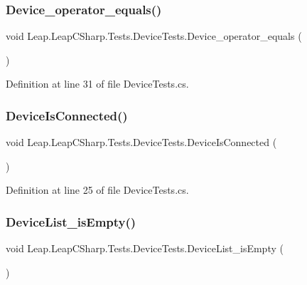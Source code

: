 \subsubsection{\texorpdfstring{Device\_operator\_equals()}{Device\_operator\_equals()}}
{\footnotesize\ttfamily void Leap.\+Leap\+C\+Sharp.\+Tests.\+Device\+Tests.\+Device\+\_\+operator\+\_\+equals (\begin{DoxyParamCaption}{ }\end{DoxyParamCaption})}



Definition at line 31 of file Device\+Tests.\+cs.

\mbox{\label{class_leap_1_1_leap_c_sharp_1_1_tests_1_1_device_tests_aa1d40f9bbc350ccc7e003e49883a0d1f}} 
\subsubsection{\texorpdfstring{DeviceIsConnected()}{DeviceIsConnected()}}
{\footnotesize\ttfamily void Leap.\+Leap\+C\+Sharp.\+Tests.\+Device\+Tests.\+Device\+Is\+Connected (\begin{DoxyParamCaption}{ }\end{DoxyParamCaption})}



Definition at line 25 of file Device\+Tests.\+cs.

\mbox{\label{class_leap_1_1_leap_c_sharp_1_1_tests_1_1_device_tests_abd312ecfe440abcd449bb3309d45dc9f}} 
\subsubsection{\texorpdfstring{DeviceList\_isEmpty()}{DeviceList\_isEmpty()}}
{\footnotesize\ttfamily void Leap.\+Leap\+C\+Sharp.\+Tests.\+Device\+Tests.\+Device\+List\+\_\+is\+Empty (\begin{DoxyParamCaption}{ }\end{DoxyParamCaption})}



